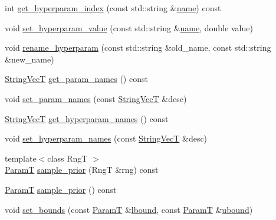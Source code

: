\begin{DoxyCompactItemize}
\item 
int \hyperlink{classmappel_1_1PointEmitterModel_ae13aa99689266d870b659d1045d595f1}{get\+\_\+hyperparam\+\_\+index} (const std\+::string \&\hyperlink{classmappel_1_1Gauss2DMAP_ab108b36b4172e55b3e53cefb645199a6}{name}) const 
\item 
void \hyperlink{classmappel_1_1PointEmitterModel_ade3e56cc00c43e9b7a521d8c4778d3b7}{set\+\_\+hyperparam\+\_\+value} (const std\+::string \&\hyperlink{classmappel_1_1Gauss2DMAP_ab108b36b4172e55b3e53cefb645199a6}{name}, double value)
\item 
void \hyperlink{classmappel_1_1PointEmitterModel_a447c83f0769e6dea2bfad68d957287d0}{rename\+\_\+hyperparam} (const std\+::string \&old\+\_\+name, const std\+::string \&new\+\_\+name)
\item 
\hyperlink{namespacemappel_aae88cf18bccfbb789a6019bcfbbfca68}{String\+VecT} \hyperlink{classmappel_1_1PointEmitterModel_aa910d1137d808041c0601f2dd3db96f0}{get\+\_\+param\+\_\+names} () const 
\item 
void \hyperlink{classmappel_1_1PointEmitterModel_a2abccbca47fc60700d73244e6c4dbe30}{set\+\_\+param\+\_\+names} (const \hyperlink{namespacemappel_aae88cf18bccfbb789a6019bcfbbfca68}{String\+VecT} \&desc)
\item 
\hyperlink{namespacemappel_aae88cf18bccfbb789a6019bcfbbfca68}{String\+VecT} \hyperlink{classmappel_1_1PointEmitterModel_a1b8bbd4bdddfb8f5236e8e50fe546c36}{get\+\_\+hyperparam\+\_\+names} () const 
\item 
void \hyperlink{classmappel_1_1PointEmitterModel_a6cdba258bda50cff162dc16a49383bb0}{set\+\_\+hyperparam\+\_\+names} (const \hyperlink{namespacemappel_aae88cf18bccfbb789a6019bcfbbfca68}{String\+VecT} \&desc)
\item 
{\footnotesize template$<$class RngT $>$ }\\\hyperlink{classmappel_1_1PointEmitterModel_a665ec6aea3aac139bb69a23c06d4b9a1}{ParamT} \hyperlink{classmappel_1_1PointEmitterModel_ae69bf3df2c94b351015bbf81e52dfe03}{sample\+\_\+prior} (RngT \&rng) const 
\item 
\hyperlink{classmappel_1_1PointEmitterModel_a665ec6aea3aac139bb69a23c06d4b9a1}{ParamT} \hyperlink{classmappel_1_1PointEmitterModel_abd9d2923ca9a838897a9b26bfb3ce073}{sample\+\_\+prior} () const 
\item 
void \hyperlink{classmappel_1_1PointEmitterModel_a31f139d9eb58f210f3359a9f5be9dd15}{set\+\_\+bounds} (const \hyperlink{classmappel_1_1PointEmitterModel_a665ec6aea3aac139bb69a23c06d4b9a1}{ParamT} \&\hyperlink{classmappel_1_1PointEmitterModel_a889bc82f74cfa654da121e5770296ab2}{lbound}, const \hyperlink{classmappel_1_1PointEmitterModel_a665ec6aea3aac139bb69a23c06d4b9a1}{ParamT} \&\hyperlink{classmappel_1_1PointEmitterModel_a35b883e84b6a2e0093bdf482c623beef}{ubound})

\end{DoxyCompactItemize}
